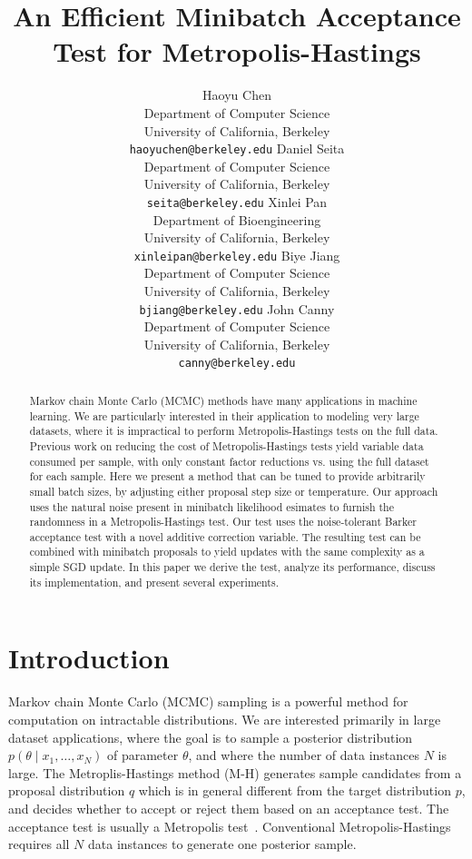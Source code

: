 \documentclass{article}
\title{An Efficient Minibatch Acceptance Test for Metropolis-Hastings}
\author{
  Haoyu Chen \\
  Department of Computer Science \\
  University of California, Berkeley \\
  \texttt{haoyuchen@berkeley.edu}
  \And
  Daniel Seita \\
  Department of Computer Science \\
  University of California, Berkeley \\
  \texttt{seita@berkeley.edu}
  \And
  Xinlei Pan \\
  Department of Bioengineering \\
  University of California, Berkeley \\
  \texttt{xinleipan@berkeley.edu}
  \And 
  Biye Jiang \\
  Department of Computer Science \\
  University of California, Berkeley \\
  \texttt{bjiang@berkeley.edu}
  \And
  John Canny \\
  Department of Computer Science \\
  University of California, Berkeley \\
  \texttt{canny@berkeley.edu}
}
\begin{document}
\maketitle

\begin{abstract}
Markov chain Monte Carlo (MCMC) methods have many applications in
machine learning. We are particularly interested in their application
to modeling very large datasets, where it is impractical to perform
Metropolis-Hastings tests on the full data. Previous work on reducing
the cost of Metropolis-Hastings tests yield variable data consumed per
sample, with only constant factor reductions vs. using the full
dataset for each sample.  Here we present a method that can be tuned
to provide arbitrarily small batch sizes, by adjusting either proposal
step size or temperature. Our approach uses the natural noise present
in minibatch likelihood esimates to furnish the randomness in a
Metropolis-Hastings test. Our test uses the noise-tolerant Barker
acceptance test with a novel additive correction variable.  The
resulting test can be combined with minibatch proposals to yield
updates with the same complexity as a simple SGD update. In this paper
we derive the test, analyze its performance, discuss its
implementation, and present several experiments.
\end{abstract}



\section{Introduction}\label{sec:introduction}

Markov chain Monte Carlo (MCMC) sampling is a powerful method for
computation on intractable distributions. We are interested primarily
in large dataset applications, where the goal is to sample a posterior
distribution $p(\theta \mid x_1, \ldots, x_N)$ of parameter $\theta$,
and where the number of data instances $N$ is large.  The
Metroplis-Hastings method (M-H) generates sample candidates from a
proposal distribution $q$ which is in general different from the
target distribution $p$, and decides whether to accept or reject them
based on an acceptance test. The acceptance test is usually a
Metropolis test~\cite{Metropolis1953,hastings70}. Conventional
Metropolis-Hastings requires all $N$ data instances to generate one
posterior sample.
\end{document}
